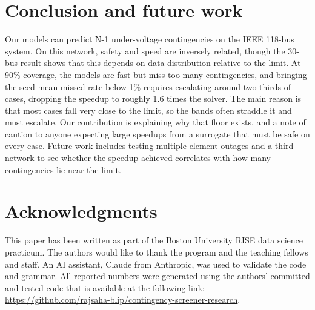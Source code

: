 \documentclass[conference]{IEEEtran}
\begin{document}
\section{Conclusion and future work}
Our models can predict N-1 under-voltage contingencies on the IEEE 118-bus system. On this network, safety and speed are inversely related, though the 30-bus result shows that this depends on data distribution relative to the limit. At 90\% coverage, the models are fast but miss too many contingencies, and bringing the seed-mean missed rate below 1\% requires escalating around two-thirds of cases, dropping the speedup to roughly 1.6 times the solver. The main reason is that most cases fall very close to the limit, so the bands often straddle it and must escalate. Our contribution is explaining why that floor exists, and a note of caution to anyone expecting large speedups from a surrogate that must be safe on every case. Future work includes testing multiple-element outages and a third network to see whether the speedup achieved correlates with how many contingencies lie near the limit.

\section*{Acknowledgments}
This paper has been written as part of the Boston University RISE data science practicum. The authors would like to thank the program and the teaching fellows and staff. An AI assistant, Claude from Anthropic, was used to validate the code and grammar. All reported numbers were generated using the authors' committed and tested code that is available at the following link: \url{https://github.com/rajsaha-blip/contingency-screener-research}. 
\end{document}
